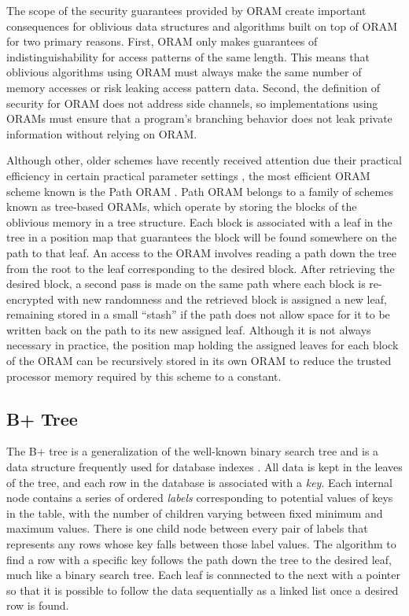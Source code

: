 \documentclass[USenglish,oneside,twocolumn]{article}
\begin{document}
The scope of the security guarantees provided by ORAM create important consequences for oblivious data structures and algorithms built on top of ORAM for two primary reasons. First, ORAM only makes guarantees of indistinguishability for access patterns of the same length. This means that oblivious algorithms using ORAM must always make the same number of memory accesses or risk leaking access pattern data. Second, the definition of security for ORAM does not address side channels, so implementations using ORAMs must ensure that a program's branching behavior does not leak private information without relying on ORAM.

Although other, older schemes have recently received attention due their practical efficiency in certain practical parameter settings \cite{ZWR+16}, the most efficient ORAM scheme known is the Path ORAM \cite{SDS+13}. Path ORAM belongs to a family of schemes known as tree-based ORAMs, which operate by storing the blocks of the oblivious memory in a tree structure. Each block is associated with a leaf in the tree in a position map that guarantees the block will be found somewhere on the path to that leaf. An access to the ORAM involves reading a path down the tree from the root to the leaf corresponding to the desired block. After retrieving the desired block, a second pass is made on the same path where each block is re-encrypted with new randomness and the retrieved block is assigned a new leaf, remaining stored in a small ``stash'' if the path does not allow space for it to be written back on the path to its new assigned leaf. Although it is not always necessary in practice, the position map holding the assigned leaves for each block of the ORAM can be recursively stored in its own ORAM to reduce the trusted processor memory required by this scheme to a constant.

\subsection{B+ Tree}

The B+ tree is a generalization of the well-known binary search tree and is a data structure frequently used for database indexes \cite{EN10, BPlus}. All data is kept in the leaves of the tree, and each row in the database is associated with a \textit{key}. Each internal node contains a series of ordered \textit{labels} corresponding to potential values of keys in the table, with the number of children varying between fixed minimum and maximum values. There is one child node between every pair of labels that represents any rows whose key falls between those label values. The algorithm to find a row with a specific key follows the path down the tree to the desired leaf, much like a binary search tree. Each leaf is connnected to the next with a pointer so that it is possible to follow the data sequentially as a linked list once a desired row is found. 
\end{document}
